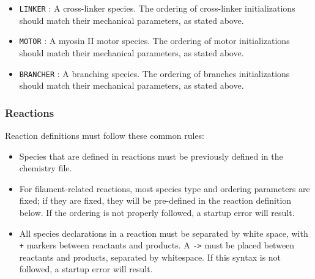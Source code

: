 \documentclass[11pt, oneside]{article}   	%
\begin{document}
\begin{itemize}
\begin{itemize}
\item \texttt{LINKER} : A cross-linker species. The ordering of cross-linker initializations should match their mechanical parameters, as stated above.
\item \texttt{MOTOR} : A myosin II motor species. The ordering of motor initializations should match their mechanical parameters, as stated above.
\item \texttt{BRANCHER} : A branching species. The ordering of branches initializations should match their mechanical parameters, as stated above.
\end{itemize}
\end{itemize}

\subsubsection{Reactions}

Reaction definitions must follow these common rules:
\begin{itemize}
\item Species that are defined in reactions must be previously defined in the chemistry file. 
\item For filament-related reactions, most species type and ordering parameters are fixed; if they are fixed, they will be pre-defined in the reaction definition below. If the ordering is not properly followed, a startup error will result. 
\item All species declarations in a reaction must be separated by white space, with \texttt{+} markers between reactants and products. A \texttt{->} must be placed between reactants and products, separated by whitespace. If this syntax is not followed, a startup error will result.
\end{itemize}
\end{document}
